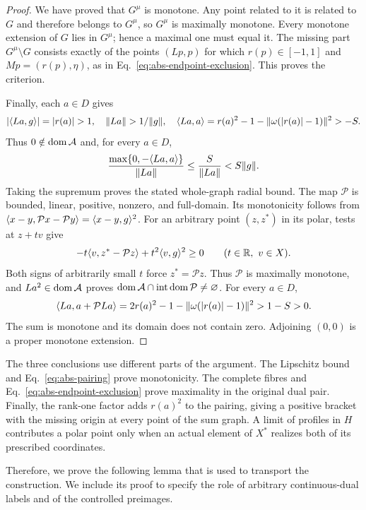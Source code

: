 \begin{proof}
We have proved that $G^\mu$ is monotone. Any point related to it
is related to $G$ and therefore belongs to $G^\mu$, so $G^\mu$
is maximally monotone. Every monotone extension of $G$ lies in
$G^\mu$; hence a maximal one must equal it. The missing part
$G^\mu\setminus G$ consists exactly of the points $(Lp,p)$ for which
$r(p)\in[-1,1]$ and $Mp=(r(p),\eta)$, as in
Eq.~\eqref{eq:abs-endpoint-exclusion}. This proves the criterion.

Finally, each $a\in D$ gives
\[
|\pair{La}{g}|=|r(a)|>1,\quad
\|La\|>1/\|g\|,\quad
\pair{La}{a}=r(a)^2-1-\|\omega(|r(a)|-1)\|^2>-S.
\]
Thus $0\notin\operatorname{dom}\mathcal A$ and, for every $a\in D$,
\[
\frac{\max\{0,-\langle La,a\rangle\}}{\|La\|}
\le\frac{S}{\|La\|}<S\|g\|.
\]
Taking the supremum proves the stated whole-graph radial bound.
The map $\mathcal P$ is bounded, linear, positive, nonzero, and full-domain.
Its monotonicity follows from
$\langle x-y,\mathcal Px-\mathcal Py\rangle=\langle x-y,g\rangle^2$.
For an arbitrary point $(z,z^*)$ in its polar, tests at $z+tv$ give
\[
-t\langle v,z^*-\mathcal Pz\rangle+t^2\langle v,g\rangle^2\ge0
\qquad(t\in\mathbb R,\ v\in X).
\]
Both signs of arbitrarily small $t$ force $z^*=\mathcal Pz$.
Thus $\mathcal P$ is maximally monotone, and $La^2\in\operatorname{dom}\mathcal A$
proves $\operatorname{dom}\mathcal A\cap\operatorname{int}\operatorname{dom}\mathcal P\ne\varnothing$.
For every $a\in D$,
\[
\langle La,a+\mathcal PLa\rangle
=2r(a)^2-1-\|\omega(|r(a)|-1)\|^2>1-S>0.
\]
The sum is monotone and its domain does not contain zero. Adjoining $(0,0)$
is a proper monotone extension.
\end{proof}

The three conclusions use different parts of the argument. The Lipschitz
bound and Eq.~\eqref{eq:abs-pairing} prove monotonicity. The complete
fibres and Eq.~\eqref{eq:abs-endpoint-exclusion} prove maximality in the
original dual pair. Finally, the rank-one factor adds $r(a)^2$ to the
pairing, giving a positive bracket with the missing origin at every point
of the sum graph. A limit of profiles in $H$ contributes a polar point only when an
actual element of $X^*$ realizes both of its prescribed coordinates.

Therefore, we prove the following lemma that is used to transport the construction.
We include its proof to specify the role of arbitrary continuous-dual
labels and of the controlled preimages. 

